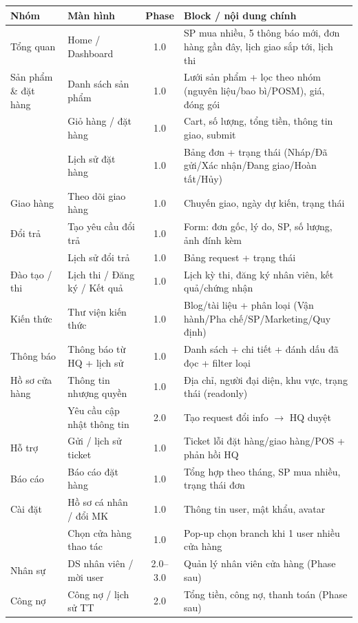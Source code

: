 \documentclass[11pt,a4paper]{article}
\begin{document}
\begin{tabularx}{\textwidth}{@{}l l c Y@{}}
\toprule
\textbf{Nhóm} & \textbf{Màn hình} & \textbf{Phase} & \textbf{Block / nội dung chính}\\
\midrule
\endhead
Tổng quan       & Home / Dashboard       & 1.0 & SP mua nhiều, 5 thông báo mới, đơn hàng gần đây, lịch giao sắp tới, lịch thi\\
Sản phẩm \& đặt hàng & Danh sách sản phẩm  & 1.0 & Lưới sản phẩm + lọc theo nhóm (nguyên liệu/bao bì/POSM), giá, đóng gói\\
                & Giỏ hàng / đặt hàng    & 1.0 & Cart, số lượng, tổng tiền, thông tin giao, submit\\
                & Lịch sử đặt hàng       & 1.0 & Bảng đơn + trạng thái (Nháp/Đã gửi/Xác nhận/Đang giao/Hoàn tất/Hủy)\\
Giao hàng       & Theo dõi giao hàng     & 1.0 & Chuyến giao, ngày dự kiến, trạng thái\\
Đổi trả         & Tạo yêu cầu đổi trả    & 1.0 & Form: đơn gốc, lý do, SP, số lượng, ảnh đính kèm\\
                & Lịch sử đổi trả        & 1.0 & Bảng request + trạng thái\\
Đào tạo / thi   & Lịch thi / Đăng ký / Kết quả & 1.0 & Lịch kỳ thi, đăng ký nhân viên, kết quả/chứng nhận\\
Kiến thức       & Thư viện kiến thức     & 1.0 & Blog/tài liệu + phân loại (Vận hành/Pha chế/SP/Marketing/Quy định)\\
Thông báo       & Thông báo từ HQ + lịch sử & 1.0 & Danh sách + chi tiết + đánh dấu đã đọc + filter loại\\
Hồ sơ cửa hàng  & Thông tin nhượng quyền & 1.0 & Địa chỉ, người đại diện, khu vực, trạng thái (readonly)\\
                & Yêu cầu cập nhật thông tin & 2.0 & Tạo request đổi info $\rightarrow$ HQ duyệt\\
Hỗ trợ          & Gửi / lịch sử ticket   & 1.0 & Ticket lỗi đặt hàng/giao hàng/POS + phản hồi HQ\\
Báo cáo         & Báo cáo đặt hàng       & 1.0 & Tổng hợp theo tháng, SP mua nhiều, trạng thái đơn\\
Cài đặt         & Hồ sơ cá nhân / đổi MK & 1.0 & Thông tin user, mật khẩu, avatar\\
                & Chọn cửa hàng thao tác & 1.0 & Pop-up chọn branch khi 1 user nhiều cửa hàng\\
Nhân sự         & DS nhân viên / mời user & 2.0--3.0 & Quản lý nhân viên cửa hàng (Phase sau)\\
Công nợ         & Công nợ / lịch sử TT   & 2.0 & Tổng tiền, công nợ, thanh toán (Phase sau)\\
\bottomrule
\end{tabularx}
\end{document}
